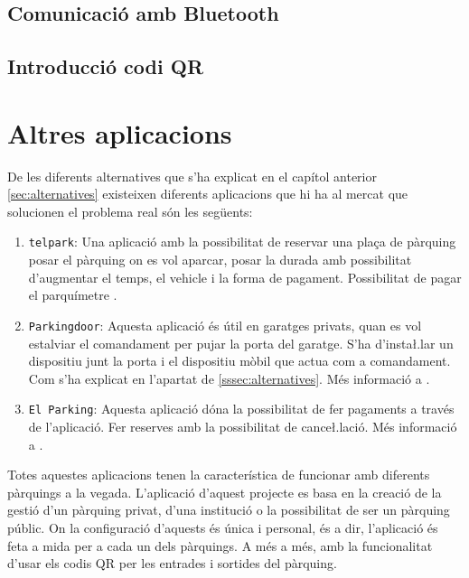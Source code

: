 \newpage
\subsection{Comunicació amb Bluetooth}


\newpage
\subsection{Introducció codi QR}


\section{Altres aplicacions}
De les diferents alternatives que s'ha explicat en el capítol anterior \autoref{sec:alternatives}
existeixen diferents aplicacions que hi ha al mercat que solucionen el problema real
són les següents:

\begin{enumerate}
    \item \texttt{telpark}: Una aplicació amb la possibilitat de reservar una plaça de pàrquing posar el pàrquing on es vol
    aparcar, posar la durada amb possibilitat d'augmentar el temps, el vehicle i la forma de pagament.
    Possibilitat de pagar el parquímetre \autocite{telpark}.
    \item \texttt{Parkingdoor}: Aquesta aplicació és útil en garatges privats, quan es vol estalviar el comandament
    per pujar la porta del garatge. S'ha d'insta\l.lar un dispositiu junt la porta i el dispositiu mòbil que actua
    com a comandament. Com s'ha explicat en l'apartat de \autoref{sssec:alternatives}.
    Més informació a \autocite{parkingdoor}.
    \item \texttt{El Parking}: Aquesta aplicació dóna la possibilitat de fer pagaments a través de l'aplicació.
    Fer reserves amb la possibilitat de cance\l.lació. Més informació a \autocite{el_parking}.
\end{enumerate}

Totes aquestes aplicacions tenen la característica de funcionar amb diferents pàrquings a la vegada.
L'aplicació d'aquest projecte es basa en la creació de la gestió d'un pàrquing privat, d'una institució o la
possibilitat de ser un pàrquing públic. On la configuració d'aquests és única i personal, és a dir, l'aplicació és feta a mida per
a cada un dels pàrquings. A més a més, amb la funcionalitat d'usar els codis QR per les entrades i sortides del pàrquing.